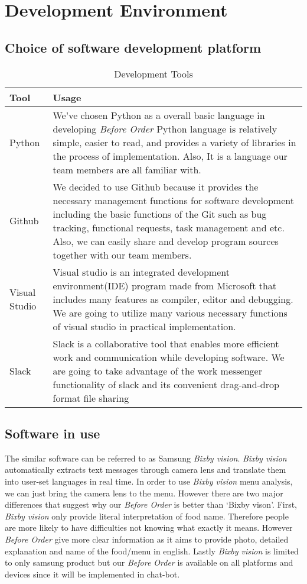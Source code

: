 \section{Development Environment}
\subsection{Choice of software development platform}
\begin{table}[htb]
\caption{Development Tools}
\begin{tabularx}{\linewidth}{|X|X|}
\toprule
Tool & Usage \\
\midrule
Python & We’ve chosen Python as a overall basic language in developing \emph{Before Order} Python language is relatively simple, easier to read, and provides a variety of libraries in the process of implementation. Also, It is a language our team members are all familiar with.\\
Github	& We decided to use Github because it provides the necessary management functions for software development including the basic functions of the Git such as bug tracking, functional requests, task management and etc. Also, we can easily share and develop program sources together with our team members.\\
Visual Studio & Visual studio is an integrated development environment(IDE) program made from Microsoft that includes many features as compiler, editor and debugging. We are going to utilize many various necessary functions of visual studio in practical implementation.\\
Slack & Slack is a collaborative tool that enables more efficient work and communication while developing software. We are going to take advantage of the work messenger functionality of slack and its convenient drag-and-drop format file sharing
\end{tabularx}
\end{table}
\FloatBarrier

\subsection{Software in use}
The similar software can be referred to as Samsung \emph{Bixby vision}. \emph{Bixby vision} automatically extracts text messages through camera lens and translate them into user-set languages in real time. In order to use \emph{Bixby vision} menu analysis, we can just bring the camera lens to the menu. However there are two major differences that suggest why our \emph{Before Order} is better than ‘Bixby vison’. First, \emph{Bixby vision} only provide literal interpretation of food name. Therefore people are more likely to have difficulties not knowing what exactly it means. However \emph{Before Order} give more clear information as it aims to provide photo, detailed explanation and name of the food/menu in english. Lastly \emph{Bixby vision} is limited to only samsung product but our \emph{Before Order} is available on all platforms and devices since it will be implemented in chat-bot.

